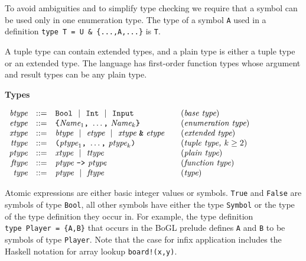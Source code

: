 \documentclass[11pt]{article}
\makeatletter
\newcommand{\prodName}[1]{&(\emph{#1})\\}
\newcommand{\nt}[1]{\textit{#1}}
\newcommand{\prog}[1]{\texttt{#1}}
\newcommand{\ORil}{\ \ |\ \ }
\newcommand{\IS}{&::=&}
\newcommand{\OR}{&|&}
\newcommand{\syntax}[2]{
  \needspace{3\baselineskip}
  \bigskip\par\noindent\textbf{#1}\par\smallskip%
  $\begin{array}{rcl@{\qquad}l}#2\end{array}$%
  \par\bigskip\noindent\ignorespaces
}
\newcommand{\lp}{\prog{(}}
\newcommand{\rp}{\prog{)}}
\newcommand{\paren}[1]{\lp#1\rp}
\makeatother
\begin{document}
To avoid ambiguities and to simplify type checking we require that a symbol can
be used only in one enumeration type. The type of a symbol \prog{A} used in a definition \prog{type~T~=~U~\&~\{...,A,...\}} is \prog{T}.

A tuple type can contain extended types, and a plain type is either a tuple
type or an extended type. The language has first-order function types whose
argument and result types can be any plain type.

\syntax{Types}{
\nt{btype}    \IS  \prog{Bool} \ORil \prog{Int} \ORil \prog{Input}
                                                         \prodName{base type}
\nt{etype}    \IS  \prog{\{}\nt{Name}_1\prog{,}\ \ldots\prog{,}\ \nt{Name}_k \prog{\}}               \prodName{enumeration type}
\nt{xtype}    \IS  \nt{btype} \ORil \nt{etype} \ORil
                   \nt{xtype}\ \prog{\&}\ \nt{etype}
                                                       \prodName{extended type}
\nt{ttype}    \IS  \paren{\nt{ptype}_1\prog{,}\ \ldots\prog{,}\ \nt{ptype}_k}
                                               \prodName{tuple type, $k\geq 2$}
\nt{ptype}     \IS  \nt{xtype} \ORil \nt{ttype}
                                                          \prodName{plain type}
\nt{ftype}    \IS  \nt{ptype}\ \prog{->}\ \nt{ptype}   \prodName{function type}
\nt{type}     \IS  \nt{ptype} \ORil \nt{ftype}                  \prodName{type}
}
%
Atomic expressions are either basic integer values or symbols. \prog{True} and
\prog{False} are symbols of type \prog{Bool}, all other symbols have either the
type \prog{Symbol} or the type of the type definition they occur in. For
example, the type definition \prog{type~Player~=~\{A,B\}} that occurs in the
BoGL prelude defines \prog{A} and \prog{B} to be symbols of type \prog{Player}.
%
Note that the case for infix application includes the Haskell notation for
array lookup \prog{board!(x,y)}.
\end{document}
